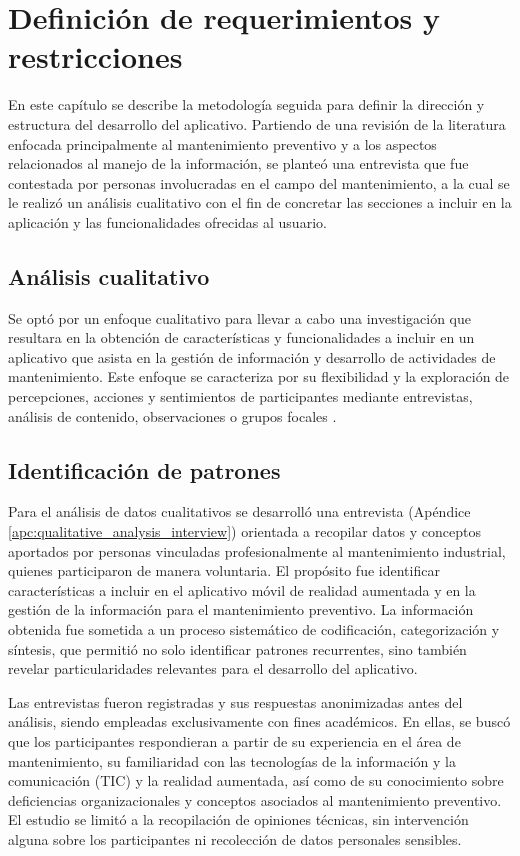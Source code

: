 \section{Definición de requerimientos y restricciones}

    En este capítulo se describe la metodología seguida para definir la dirección y estructura del desarrollo del aplicativo. Partiendo de una revisión de la literatura enfocada principalmente al mantenimiento preventivo y a los aspectos relacionados al manejo de la información, se planteó una entrevista que fue contestada por personas involucradas en el campo del mantenimiento, a la cual se le realizó un análisis cualitativo con el fin de concretar las secciones a incluir en la aplicación y las funcionalidades ofrecidas al usuario.

    \subsection{Análisis cualitativo}

        Se optó por un enfoque cualitativo para llevar a cabo una investigación que resultara en la obtención de características y funcionalidades a incluir en un aplicativo que asista en la gestión de  información y desarrollo de actividades de mantenimiento. Este enfoque se caracteriza por su flexibilidad y la exploración de percepciones, acciones y sentimientos de participantes mediante entrevistas, análisis de contenido, observaciones o grupos focales \parencite{BARROGA:2023}.

    \subsection{Identificación de patrones}

        Para el análisis de datos cualitativos se desarrolló una entrevista (Apéndice \ref{apc:qualitative_analysis_interview}) orientada a recopilar datos y conceptos aportados por personas vinculadas profesionalmente al mantenimiento industrial, quienes participaron de manera voluntaria. El propósito fue identificar características a incluir en el aplicativo móvil de realidad aumentada y en la gestión de la información para el mantenimiento preventivo. La información obtenida fue sometida a un proceso sistemático de codificación, categorización y síntesis, que permitió no solo identificar patrones recurrentes, sino también revelar particularidades relevantes para el desarrollo del aplicativo.

        Las entrevistas fueron registradas y sus respuestas anonimizadas antes del análisis, siendo empleadas exclusivamente con fines académicos. En ellas, se buscó que los participantes respondieran a partir de su experiencia en el área de mantenimiento, su familiaridad con las tecnologías de la información y la comunicación (TIC) y la realidad aumentada, así como de su conocimiento sobre deficiencias organizacionales y conceptos asociados al mantenimiento preventivo. El estudio se limitó a la recopilación de opiniones técnicas, sin intervención alguna sobre los participantes ni recolección de datos personales sensibles.

